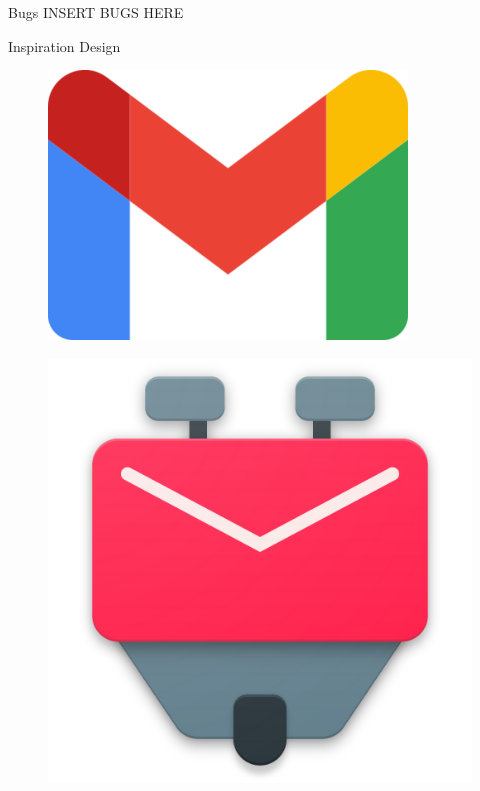 \documentclass[aspectratio=169]{beamer}
\begin{document}
\begin{frame}{Bugs}
INSERT BUGS HERE
\end{frame}

\begin{frame}{Inspiration Design}
\begin{varwidth}{.3\textwidth}
        \begin{figure}
            \centering
            \includegraphics[width=.9\textwidth]{media/gmail-logo.png}
        \end{figure}
    \end{varwidth}
    \hfill
    \begin{varwidth}{.3\textwidth}
        \begin{figure}
        \centering
        \includegraphics[width=.9\textwidth]{media/k9-logo.png}

\end{figure}
\end{varwidth}
\end{frame}
\end{document}
